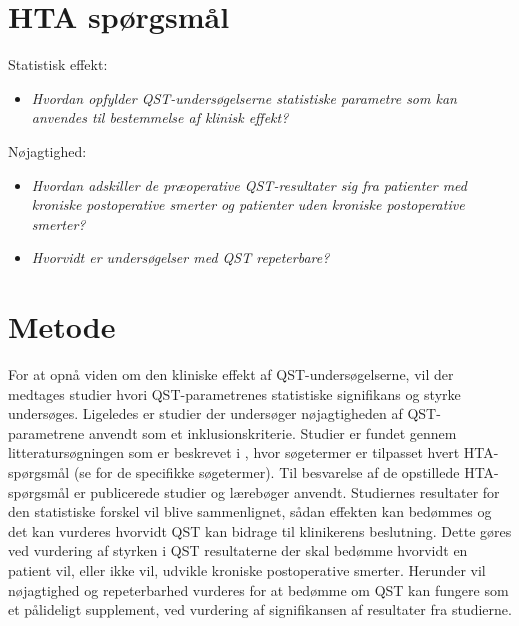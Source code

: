 \section{HTA spørgsmål}
Statistisk effekt:
\begin{itemize}
	\item \textit{Hvordan opfylder QST-undersøgelserne statistiske parametre som kan anvendes til bestemmelse af klinisk effekt?} %
\end{itemize}
Nøjagtighed:
\begin{itemize}
	\item \textit{Hvordan adskiller de præoperative QST-resultater sig fra patienter med kroniske postoperative smerter og patienter uden kroniske postoperative smerter?} %
	\item \textit{Hvorvidt er undersøgelser med QST repeterbare?} 
\end{itemize}

\section{Metode}
For at opnå viden om den kliniske effekt af QST-undersøgelserne, vil der medtages studier hvori QST-parametrenes statistiske signifikans og styrke undersøges. Ligeledes er studier der undersøger nøjagtigheden af QST-parametrene anvendt som et inklusionskriterie. Studier er fundet gennem litteratursøgningen som er beskrevet i , hvor søgetermer er tilpasset hvert HTA-spørgsmål (se  for de specifikke søgetermer). Til besvarelse af de opstillede HTA-spørgsmål er publicerede studier og lærebøger anvendt. 
Studiernes resultater for den statistiske forskel vil blive sammenlignet, sådan effekten kan bedømmes og det kan vurderes hvorvidt QST kan bidrage til klinikerens beslutning. Dette gøres ved vurdering af styrken i QST resultaterne der skal bedømme hvorvidt en patient vil, eller ikke vil, udvikle kroniske postoperative smerter. Herunder vil nøjagtighed og repeterbarhed vurderes for at bedømme om QST kan fungere som et pålideligt supplement, ved vurdering af signifikansen af resultater fra studierne.


